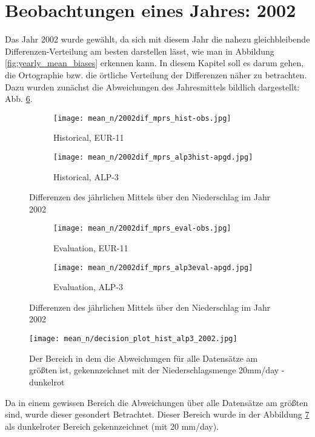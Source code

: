 \section{Beobachtungen eines Jahres: 2002}
Das Jahr 2002 wurde gewählt, da sich mit diesem Jahr die nahezu gleichbleibende Differenzen-Verteilung am besten darstellen lässt, wie man in Abbildung \ref{fig:yearly_mean_biases} erkennen kann. In diesem Kapitel soll es darum gehen, die Ortographie bzw. die örtliche Verteilung der Differenzen näher zu betrachten. Dazu wurden zunächst die Abweichungen des Jahresmittels bildlich dargestellt: Abb. \ref{fig:dif_mean_2002}.  
\begin{figure}[h]
		\begin{subfigure}{0.49\textwidth}
			\texttt{[image: mean\_n/2002dif\_mprs\_hist-obs.jpg]}
			\caption{Historical, EUR-11}
			\label{fig:dif_mean_2002:eur11_hist}
		\end{subfigure}
		\begin{subfigure}{0.49\textwidth}
			\texttt{[image: mean\_n/2002dif\_mprs\_alp3hist-apgd.jpg]}
			\caption{Historical, ALP-3}
			\label{fig:dif_mean_2002:alp3_hist}
		\end{subfigure}
	\caption{Differenzen des jährlichen Mittels über den Niederschlag im Jahr 2002}
	\label{fig:dif_mean_2002}
\end{figure}
\begin{figure}
		\begin{subfigure}{0.49\textwidth}
			\texttt{[image: mean\_n/2002dif\_mprs\_eval-obs.jpg]}
			\caption{Evaluation, EUR-11}
			\label{fig:dif_mean_2002:eur11_eval}
		\end{subfigure}
		\begin{subfigure}{0.49\textwidth}
			\texttt{[image: mean\_n/2002dif\_mprs\_alp3eval-apgd.jpg]}
			\caption{Evaluation, ALP-3}
			\label{fig:dif_mean_2002:alp3_eval}
		\end{subfigure}
	\caption{Differenzen des jährlichen Mittels über den Niederschlag im Jahr 2002}
	\label{fig:dif_mean_2002}
\end{figure}
\begin{figure}
	\texttt{[image: mean\_n/decision\_plot\_hist\_alp3\_2002.jpg]}
	\caption{Der Bereich in dem die Abweichungen für alle Datensätze am größten ist, gekennzeichnet mit der Niederschlagsmenge 20mm/day - dunkelrot}
	\label{fig:decision_mean_2002}
\end{figure}

Da in einem gewissen Bereich die Abweichungen über alle Datensätze am größten sind, wurde dieser gesondert Betrachtet. Dieser Bereich wurde in der Abbildung \ref{fig:decision_mean_2002} als dunkelroter Bereich gekennzeichnet (mit 20 mm/day).

